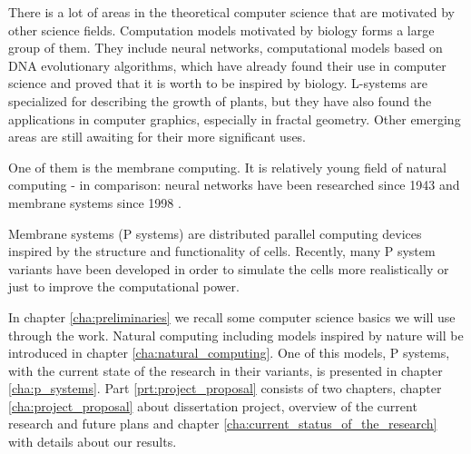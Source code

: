 
There is a lot of areas in the theoretical computer science that are motivated by other science fields. Computation models motivated by biology forms a large group of them. They include neural networks, computational models based on DNA evolutionary algorithms, which have already found their use in computer science and proved that it is worth to be inspired by biology. L-systems are specialized for describing the growth of plants, but they have also found the applications in computer graphics, especially in fractal geometry. Other emerging areas are still awaiting for their more significant uses.

One of them is the membrane computing. It is relatively young field of natural computing - in comparison: neural networks have been researched since 1943 and membrane systems since 1998 \cite{Paun98}.

Membrane systems (P systems) are distributed parallel computing devices inspired by the structure and functionality of cells. Recently, many P system variants have been developed in order to simulate the cells more realistically or just to improve the computational power.

In chapter \ref{cha:preliminaries} we recall some computer science basics we will use through the work.
Natural computing including models inspired by nature will be introduced in chapter \ref{cha:natural_computing}. One of this models, P systems, with the current state of the research in their variants, is presented in chapter \ref{cha:p_systems}. Part \ref{prt:project_proposal} consists of two chapters, chapter \ref{cha:project_proposal} about dissertation project, overview of the current research and future plans and chapter \ref{cha:current_status_of_the_research} with details about our results.